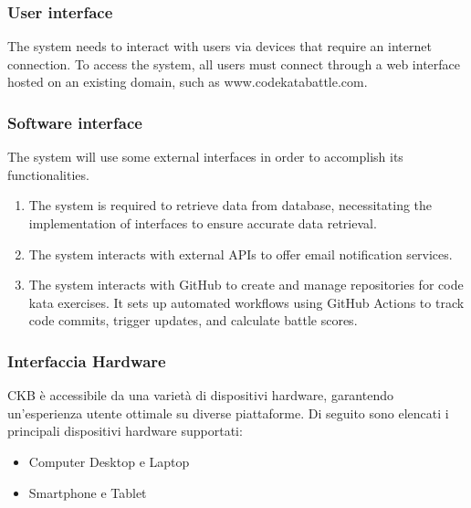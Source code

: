 \subsubsection{User interface}
The system needs to interact with users via devices that require an internet connection. To access the system, all users must connect through a web interface hosted on an existing domain, such as www.codekatabattle.com.
\subsubsection{Software interface}
The system will use some  external interfaces in order to accomplish its functionalities.
\begin{enumerate}
    \item The system is required to retrieve data from  database, necessitating the implementation of  interfaces to ensure accurate data retrieval.
    \item The system interacts with external APIs to offer email notification services.
    \item The system interacts with GitHub to create and manage repositories for code kata exercises. It sets up automated workflows using GitHub Actions to track code commits, trigger updates, and calculate battle scores.
\end{enumerate}
\subsubsection{Interfaccia Hardware}

CKB è accessibile da una varietà di dispositivi hardware, garantendo un'esperienza utente ottimale su diverse piattaforme. Di seguito sono elencati i principali dispositivi hardware supportati:

\begin{itemize}
    \item Computer Desktop e Laptop

    \item Smartphone e Tablet 

\end{itemize}






